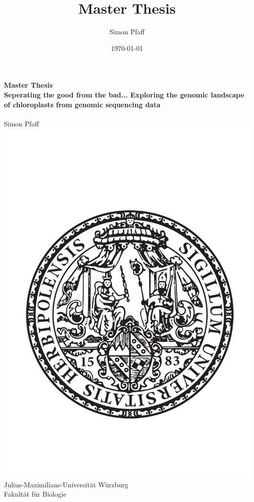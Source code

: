 \documentclass{scrartcl}
\author{Simon Pfaff}
\date{\today}
\title{Master Thesis}
\begin{document}
\begin{center}
\thispagestyle{empty}
\textbf{\huge Master Thesis}\\[2mm]
\textbf{\huge Seperating the good from the bad... Exploring the genomic landscape of chloroplasts from genomic sequencing data}\\[5mm]
\textbf{\LARGE }\\[3mm]
{\LARGE Simon Pfaff}\\[2mm]
\includegraphics[width=.7\linewidth]{./neuSIEGEL.pdf}
{\large Julius-Maximilians-Universität Würzburg}\\[1mm]
{\large Fakultät für Biologie}
\end{center}
\cleardoublepage
\
\thispagestyle{empty}
\maketitle
\end{document}
